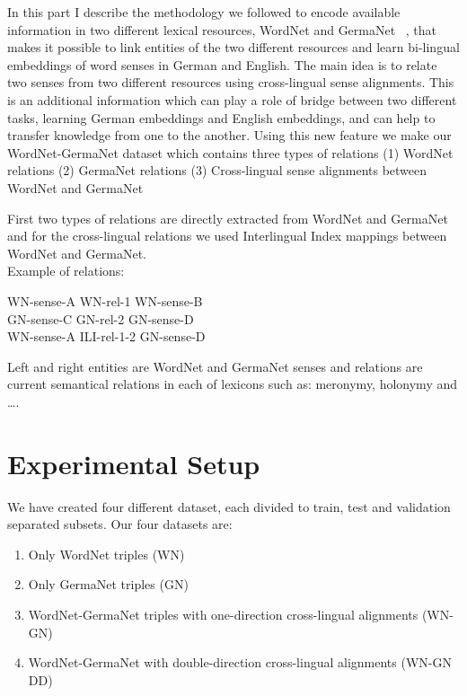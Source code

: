 In this part I describe the methodology we followed to encode available information 
in two different lexical resources, WordNet and GermaNet ~\cite{BirgitHamp},
that makes it possible to link entities of the two different resources and learn bi-lingual 
embeddings of word senses in German and English.  
The main idea is to relate two senses from two different resources using cross-lingual sense alignments.
This is an additional information which can play a role of bridge between two
different tasks, learning German embeddings and English embeddings, and can help to transfer knowledge from one to the another.
Using this new feature we make our WordNet-GermaNet dataset which contains three
types of relations
(1) WordNet relations 
(2) GermaNet relations
(3) Cross-lingual sense alignments between WordNet and GermaNet

First two types of relations are directly extracted from WordNet and GermaNet and for the 
cross-lingual relations we used Interlingual Index mappings between WordNet and GermaNet.
\\
Example of relations:
\begin{center}
WN-sense-A \hspace{0.3in}  WN-rel-1    \hspace{0.3in}  WN-sense-B\\
GN-sense-C \hspace{0.3in}  GN-rel-2    \hspace{0.3in}  GN-sense-D\\
WN-sense-A \hspace{0.3in}  ILI-rel-1-2 \hspace{0.3in}  GN-sense-D\\
\end{center}

Left and right entities are WordNet and GermaNet senses and relations are current semantical relations
 in each of lexicons such as:
 meronymy, holonymy and \ldots.


\section{Experimental Setup}
\label{sec:xkb-exp}

 
 We have created four different dataset, each divided to train, test and validation separated subsets. Our four datasets are:
 \begin{enumerate}
 \item Only WordNet triples (WN)
 \item Only GermaNet triples (GN)
 \item WordNet-GermaNet triples with one-direction cross-lingual alignments (WN-GN)
 \item WordNet-GermaNet with double-direction cross-lingual alignments (WN-GN DD)
 \end{enumerate}
 
